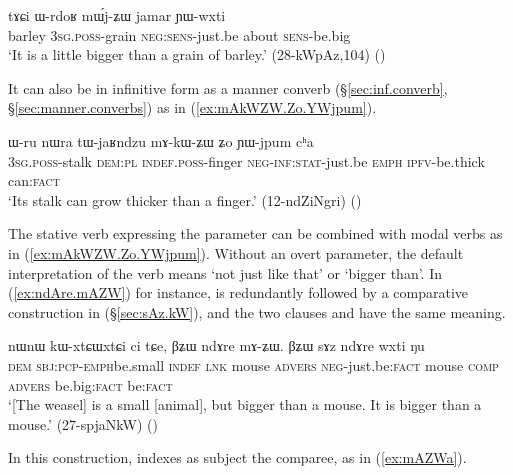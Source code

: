 \begin{exe}
\ex \label{ex:mWjZW.jamar}
 \gll tɤɕi ɯ-rdoʁ mɯ́j-ʑɯ jamar ɲɯ-wxti \\
 barley \textsc{3sg}.\textsc{poss}-grain \textsc{neg}:\textsc{sens}-just.be about \textsc{sens}-be.big \\
 \glt `It is a little bigger than a grain of barley.' (28-kWpAz,104)
()
\end{exe}

It can also be in infinitive form  as a manner converb (§\ref{sec:inf.converb}, §\ref{sec:manner.converbs}) as in (\ref{ex:mAkWZW.Zo.YWjpum}). 

\begin{exe}
\ex \label{ex:mAkWZW.Zo.YWjpum}
 \gll ɯ-ru nɯra tɯ-jaʁndzu mɤ-kɯ-ʑɯ ʑo ɲɯ-jpum cʰa \\
\textsc{3sg}.\textsc{poss}-stalk \textsc{dem}:\textsc{pl} \textsc{indef}.\textsc{poss}-finger \textsc{neg}-\textsc{inf}:\textsc{stat}-just.be \textsc{emph} \textsc{ipfv}-be.thick can:\textsc{fact} \\
 \glt `Its stalk can grow thicker than a finger.' (12-ndZiNgri)
()
\end{exe}

The stative verb expressing the parameter can be combined with modal verbs as in (\ref{ex:mAkWZW.Zo.YWjpum}). Without an overt parameter, the default interpretation of the verb  means `not just like that' or `bigger than'. In (\ref{ex:ndAre.mAZW}) for instance,  is redundantly followed by a comparative construction in  (§\ref{sec:sAz.kW}), and the two clauses  and  have the same meaning.

\begin{exe}
\ex \label{ex:ndAre.mAZW}
 \gll nɯnɯ kɯ-xtɕɯ\redp{}xtɕi ci tɕe, βʑɯ ndɤre mɤ-ʑɯ. βʑɯ sɤz ndɤre wxti ŋu \\
 \textsc{dem} \textsc{sbj}:\textsc{pcp}-\textsc{emph}\redp{}be.small \textsc{indef} \textsc{lnk} mouse \textsc{advers} \textsc{neg}-just.be:\textsc{fact} mouse \textsc{comp} \textsc{advers} be.big:\textsc{fact} be:\textsc{fact} \\
\glt `[The weasel] is a small [animal], but bigger than a mouse. It is bigger than a mouse.' (27-spjaNkW)
()
\end{exe}

In this construction,  indexes as subject the comparee, as in (\ref{ex:mAZWa}).

